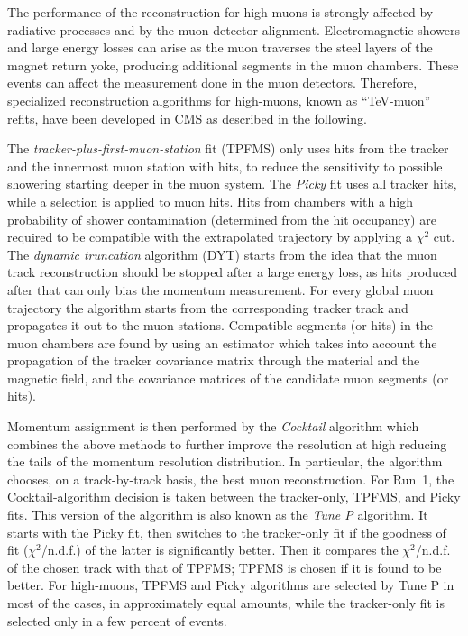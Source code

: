 The performance of the reconstruction for high-\pt muons is strongly affected by radiative processes and by the muon detector alignment. 
Electromagnetic showers and large energy losses can arise as the muon traverses the steel layers of the magnet return yoke, producing additional segments in the muon chambers.
These events can affect the measurement done in the muon detectors. Therefore, specialized reconstruction algorithms for high-\pt muons, known as ``TeV-muon'' refits, have been developed in CMS as described in the following.

The \textit{tracker-plus-first-muon-station} fit (TPFMS) only uses hits from the tracker and the innermost muon station with hits, to reduce the sensitivity to possible showering starting deeper in the muon system. The \textit{Picky} fit uses all tracker hits, while a selection is applied to muon hits. Hits from chambers with a high probability of shower contamination (determined from the hit occupancy) are required to be compatible with the extrapolated trajectory by applying a $\chi^2$ cut. The \textit{dynamic truncation} algorithm (DYT) starts from the idea that the muon track reconstruction should be stopped after a large energy loss, as hits produced after that can only bias the momentum measurement. For every global muon trajectory the algorithm starts from the corresponding tracker track and propagates it out to the muon stations. Compatible segments (or hits) in the muon chambers are found by using an estimator which takes into account the propagation of the tracker covariance matrix through the material and the magnetic field, and the covariance matrices of the candidate muon segments (or hits).

Momentum assignment is then performed by the \textit{Cocktail} algorithm which combines the above methods to further improve the resolution at high \pt reducing the tails of the momentum resolution distribution.
In particular, the algorithm chooses, on a track-by-track basis, the best muon reconstruction. For Run~1, the Cocktail-algorithm decision is taken between the tracker-only, TPFMS, and Picky fits. 
This version of the algorithm is also known as the \textit{Tune P} algorithm. It starts with the Picky fit, then switches to the tracker-only fit if the goodness of fit ($\chi^2$/n.d.f.) of the latter is significantly better. Then it compares the $\chi^2$/n.d.f. of the chosen track with that of TPFMS; TPFMS is chosen if it is found to be better. For high-\pt muons, TPFMS and Picky algorithms are selected by Tune P in most of the cases, in approximately equal amounts, while the tracker-only fit is selected only in a few percent of events. 


